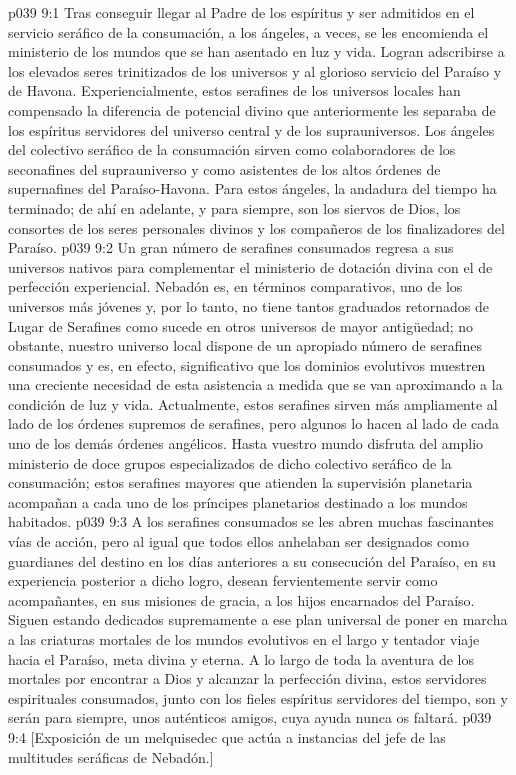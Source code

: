 \vs p039 9:1 Tras conseguir llegar al Padre de los espíritus y ser admitidos en el servicio seráfico de la consumación, a los ángeles, a veces, se les encomienda el ministerio de los mundos que se han asentado en luz y vida. Logran adscribirse a los elevados seres trinitizados de los universos y al glorioso servicio del Paraíso y de Havona. Experiencialmente, estos serafines de los universos locales han compensado la diferencia de potencial divino que anteriormente les separaba de los espíritus servidores del universo central y de los suprauniversos. Los ángeles del colectivo seráfico de la consumación sirven como colaboradores de los seconafines del suprauniverso y como asistentes de los altos órdenes de supernafines del Paraíso\hyp{}Havona. Para estos ángeles, la andadura del tiempo ha terminado; de ahí en adelante, y para siempre, son los siervos de Dios, los consortes de los seres personales divinos y los compañeros de los finalizadores del Paraíso.
\vs p039 9:2 Un gran número de serafines consumados regresa a sus universos nativos para complementar el ministerio de dotación divina con el de perfección experiencial. Nebadón es, en términos comparativos, uno de los universos más jóvenes y, por lo tanto, no tiene tantos graduados retornados de Lugar de Serafines como sucede en otros universos de mayor antigüedad; no obstante, nuestro universo local dispone de un apropiado número de serafines consumados y es, en efecto, significativo que los dominios evolutivos muestren una creciente necesidad de esta asistencia a medida que se van aproximando a la condición de luz y vida. Actualmente, estos serafines sirven más ampliamente al lado de los órdenes supremos de serafines, pero algunos lo hacen al lado de cada uno de los demás órdenes angélicos. Hasta vuestro mundo disfruta del amplio ministerio de doce grupos especializados de dicho colectivo seráfico de la consumación; estos serafines mayores que atienden la supervisión planetaria acompañan a cada uno de los príncipes planetarios destinado a los mundos habitados.
\vs p039 9:3 A los serafines consumados se les abren muchas fascinantes vías de acción, pero al igual que todos ellos anhelaban ser designados como guardianes del destino en los días anteriores a su consecución del Paraíso, en su experiencia posterior a dicho logro, desean fervientemente servir como acompañantes, en sus misiones de gracia, a los hijos encarnados del Paraíso. Siguen estando dedicados supremamente a ese plan universal de poner en marcha a las criaturas mortales de los mundos evolutivos en el largo y tentador viaje hacia el Paraíso, meta divina y eterna. A lo largo de toda la aventura de los mortales por encontrar a Dios y alcanzar la perfección divina, estos servidores espirituales consumados, junto con los fieles espíritus servidores del tiempo, son y serán para siempre, unos auténticos amigos, cuya ayuda nunca os faltará.
\vsetoff
\vs p039 9:4 [Exposición de un melquisedec que actúa a instancias del jefe de las multitudes seráficas de Nebadón.]
